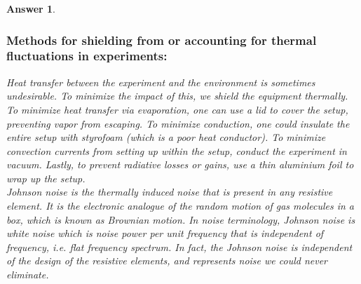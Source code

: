 \documentclass[a4paper]{article}
\newtheorem{ans}{Answer}[subsection]
\theoremstyle{new}
\begin{document}
\begin{ans}
\subsubsection*{Methods for shielding from or accounting for thermal fluctuations in experiments:}
Heat transfer between the experiment and the environment is sometimes undesirable. To minimize the impact of this, we shield the equipment thermally. To minimize heat transfer via evaporation, one can use a lid to cover the setup, preventing vapor from escaping. To minimize conduction, one could insulate the entire setup with styrofoam (which is a poor heat conductor). To minimize convection currents from setting up within the setup, conduct the experiment in vacuum. Lastly, to prevent radiative losses or gains, use a thin aluminium foil to wrap up the setup.\\[5pt]
Johnson noise is the thermally induced noise that is present in any resistive element. It is the electronic analogue of the random motion of gas molecules in a box, which is known as Brownian motion. In noise terminology, Johnson noise is white noise which is noise power per unit frequency that is independent of frequency, i.e. flat frequency spectrum. In fact, the Johnson noise is independent of the design of the resistive elements, and represents noise we could never eliminate.

\end{ans}
\end{document}
